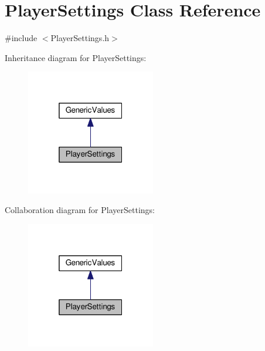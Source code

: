 \hypertarget{classPlayerSettings}{}\section{Player\+Settings Class Reference}
\label{classPlayerSettings}


{\ttfamily \#include $<$Player\+Settings.\+h$>$}



Inheritance diagram for Player\+Settings\+:
\nopagebreak
\begin{figure}[H]
\begin{center}
\leavevmode
\includegraphics[width=160pt]{classPlayerSettings__inherit__graph}
\end{center}
\end{figure}


Collaboration diagram for Player\+Settings\+:
\nopagebreak
\begin{figure}[H]
\begin{center}
\leavevmode
\includegraphics[width=160pt]{classPlayerSettings__coll__graph}
\end{center}
\end{figure}
